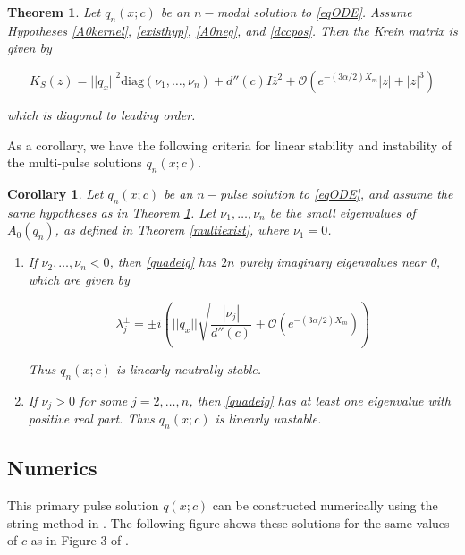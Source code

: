 \documentclass[12pt]{article}
\newtheorem{theorem}{Theorem}
\newtheorem{corollary}{Corollary}
\begin{document}
\begin{theorem}\label{Kreindiag}
Let $q_n(x; c)$ be an $n-$modal solution to \eqref{eqODE}. Assume Hypotheses \ref{A0kernel}, \ref{existhyp}, \ref{A0neg}, and \ref{dccpos}. Then the Krein matrix is given by

\begin{equation}\label{Kreinapprox}
K_S(z) = ||q_x||^2 \text{diag} (\nu_1, \dots, \nu_n)
 + d''(c) I \overline{z}^2 + \mathcal{O}(e^{-(3 \alpha/2) X_m}|z| + |z|^3)
\end{equation}

which is diagonal to leading order.

\end{theorem}

As a corollary, we have the following criteria for linear stability and instability of the multi-pulse solutions $q_n(x; c)$.

\begin{corollary}\label{stabcrit}
Let $q_n(x; c)$ be an $n-$pulse solution to \eqref{eqODE}, and assume the same hypotheses as in Theorem \ref{Kreindiag}. Let $\nu_1, \dots, \nu_n$ be the small eigenvalues of $A_0(q_n)$, as defined in Theorem \ref{multiexist}, where $\nu_1 = 0$.
\begin{enumerate}
	\item If $\nu_2, \dots, \nu_n < 0$, then \eqref{quadeig} has $2n$ purely imaginary eigenvalues near 0, which are given by

	\begin{equation}\label{npulseKreineigs}
	\lambda_j^\pm = \pm i \left( ||q_x|| \sqrt{ \frac{|\nu_j|}{d''(c)} } + \mathcal{O}(e^{-(3 \alpha/2) X_m}) \right)
	\end{equation}

	Thus $q_n(x; c)$ is linearly neutrally stable.

	\item If $\nu_j > 0$ for some $j = 2, \dots, n$, then \eqref{quadeig} has at least one eigenvalue with positive real part. Thus $q_n(x; c)$ is linearly unstable.
\end{enumerate}

\end{corollary}

\subsection{Numerics}

This primary pulse solution $q(x; c)$ can be constructed numerically using the string method in \cite{Chamard2011}. The following figure shows these solutions for the same values of $c$ as in Figure 3 of \cite{Chen1997}.
\end{document}

